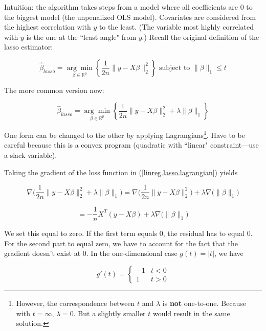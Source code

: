 Intuition: the algorithm takes steps from a model where all coefficients are 0 to the biggest model (the unpenalized OLS model). Covariates are considered from the highest correlation with \(y\) to the least. (The variable most highly correlated with \(y\) is the one at the ``least angle" from \(y\).) Recall the original definition of the lasso estimator:

\begin{equation}\label{linreg.lasso.constrained}
\hat{\beta}_{lasso} = \underset{\beta \in \mathbb{R}^p}{\arg \min}\left\{ \frac{1}{2n}\lVert y - X \beta \rVert_2^2 \right\} \text{ subject to } \lVert \beta \rVert_1 \leq t
\end{equation}

The more common version now:

\begin{equation}\label{linreg.lasso.lagrangian}
\hat{\beta}_{lasso} =\underset{\beta \in \mathbb{R}^p}{\arg \min} \left\{ \frac{1}{2n}\lVert y - X \beta \rVert_2^2   + \lambda \lVert \beta \rVert_1 \right\}
\end{equation}

One form can be changed to the other by applying Lagrangians\footnote{However, the correspondence between \(t\) and \(\lambda\) is \textbf{not} one-to-one. Because with \(t = \infty\), \(\lambda =0\). But a slightly smaller \(t\) would result in the same solution.}. Have to be careful because this is a convex program (quadratic with ``linear" constraint---use a slack variable). 

Taking the gradient of the loss function in (\ref{linreg.lasso.lagrangian}) yields

\[
\nabla \bigg(  \frac{1}{2n}\lVert y - X \beta \rVert_2^2   + \lambda \lVert \beta \rVert_1 \bigg) = \nabla   \bigg( \frac{1}{2n}\lVert y - X \beta \rVert_2^2   \bigg) + \lambda \nabla \big( \lVert \beta \rVert_1 \big)
\]

\begin{equation}\label{linreg.lasso.lagrangian.gradient}
= - \frac{1}{n} X^T(y - X \beta) + \lambda \nabla  \big( \lVert \beta \rVert_1 \big)
\end{equation}

We set this equal to zero. If the first term equals 0, the residual has to equal 0. For the second part to equal zero, we have to account for the fact that the gradient doesn't exist at 0. In the one-dimensional case \(g(t) = |t|\), we have

\[
g'(t) = \begin{cases}
-1 & t < 0 \\
1 & t > 0
\end{cases}
\]

